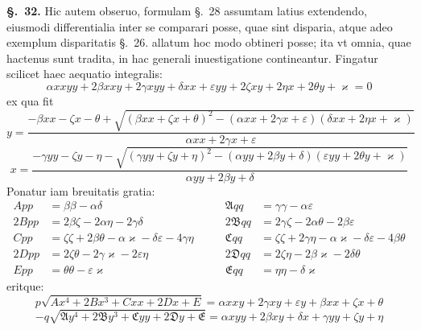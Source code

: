 \documentclass{article}
\begin{document}
\textbf{§.~32.} Hic autem obseruo, formulam §.~28 assumtam latius extendendo, eiusmodi
differentialia inter se comparari posse, quae sint disparia, atque adeo exemplum disparitatis
§.~26. allatum hoc modo obtineri posse; ita vt omnia, quae hactenus sunt tradita, in hac generali
inuestigatione contineantur. Fingatur scilicet haec aequatio integralis:
\[ \alpha xxyy + 2\beta xxy + 2\gamma xyy + \delta xx + \varepsilon yy + 2\zeta xy + 2\eta x + 2\theta y + \varkappa = 0 \tag{1} \]
ex qua fit
\[ y = \frac{-\beta xx - \zeta x - \theta + \sqrt{(\beta xx + \zeta x + \theta)^{2} - (\alpha xx + 2\gamma x + \varepsilon)(\delta xx + 2\eta x + \varkappa)}}{\alpha xx + 2\gamma x + \varepsilon} \tag{2} \]
\[ x = \frac{-\gamma yy - \zeta y - \eta - \sqrt{(\gamma yy + \zeta y + \eta)^{2} - (\alpha yy + 2\beta y + \delta)(\varepsilon yy + 2\theta y + \varkappa)}}{\alpha yy + 2\beta y + \delta} \tag{3} \]
Ponatur iam breuitatis gratia:
\[ \begin{aligned}
App &= \beta\beta - \alpha\delta &\qquad \mathfrak{A}qq &= \gamma\gamma - \alpha\varepsilon \\
2Bpp &= 2\beta\zeta - 2\alpha\eta - 2\gamma\delta &\qquad 2\mathfrak{B}qq &= 2\gamma\zeta - 2\alpha\theta - 2\beta\varepsilon \\
Cpp &= \zeta\zeta + 2\beta\theta - \alpha\varkappa - \delta\varepsilon - 4\gamma\eta &\qquad \mathfrak{C}qq &= \zeta\zeta + 2\gamma\eta - \alpha\varkappa - \delta\varepsilon - 4\beta\theta \\
2Dpp &= 2\zeta\theta - 2\gamma\varkappa - 2\varepsilon\eta &\qquad 2\mathfrak{D}qq &= 2\zeta\eta - 2\beta\varkappa - 2\delta\theta \\
Epp &= \theta\theta - \varepsilon\varkappa &\qquad \mathfrak{E}qq &= \eta\eta - \delta\varkappa
\end{aligned} \]
eritque:
\[ p\sqrt{Ax^{4} + 2Bx^{3} + Cxx + 2Dx + E} = \alpha xxy + 2\gamma xy + \varepsilon y + \beta xx + \zeta x + \theta \tag{4} \]
\[ -q\sqrt{\mathfrak{A}y^{4} + 2\mathfrak{B}y^{3} + \mathfrak{C}yy + 2\mathfrak{D}y + \mathfrak{E}} = \alpha xyy + 2\beta xy + \delta x + \gamma yy + \zeta y + \eta \tag{5} \]
\end{document}
